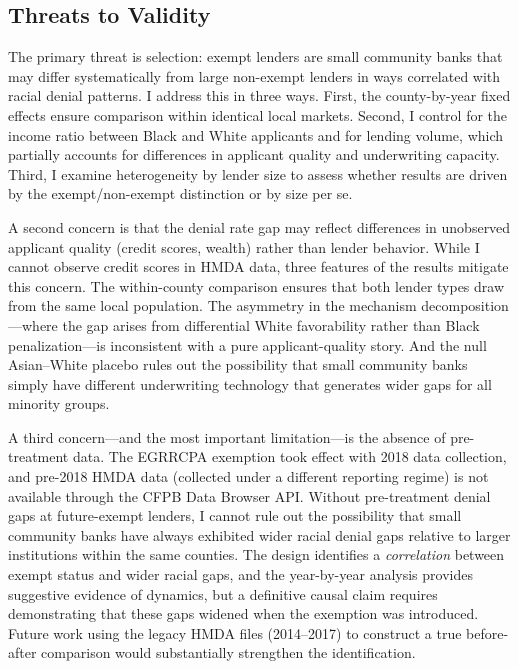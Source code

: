 \documentclass[12pt]{article}
\begin{document}
\subsection{Threats to Validity}

The primary threat is selection: exempt lenders are small community banks that may differ systematically from large non-exempt lenders in ways correlated with racial denial patterns. I address this in three ways. First, the county-by-year fixed effects ensure comparison within identical local markets. Second, I control for the income ratio between Black and White applicants and for lending volume, which partially accounts for differences in applicant quality and underwriting capacity. Third, I examine heterogeneity by lender size to assess whether results are driven by the exempt/non-exempt distinction or by size per se.

A second concern is that the denial rate gap may reflect differences in unobserved applicant quality (credit scores, wealth) rather than lender behavior. While I cannot observe credit scores in HMDA data, three features of the results mitigate this concern. The within-county comparison ensures that both lender types draw from the same local population. The asymmetry in the mechanism decomposition---where the gap arises from differential White favorability rather than Black penalization---is inconsistent with a pure applicant-quality story. And the null Asian--White placebo rules out the possibility that small community banks simply have different underwriting technology that generates wider gaps for all minority groups.

A third concern---and the most important limitation---is the absence of pre-treatment data. The EGRRCPA exemption took effect with 2018 data collection, and pre-2018 HMDA data (collected under a different reporting regime) is not available through the CFPB Data Browser API. Without pre-treatment denial gaps at future-exempt lenders, I cannot rule out the possibility that small community banks have always exhibited wider racial denial gaps relative to larger institutions within the same counties. The design identifies a \textit{correlation} between exempt status and wider racial gaps, and the year-by-year analysis provides suggestive evidence of dynamics, but a definitive causal claim requires demonstrating that these gaps widened when the exemption was introduced. Future work using the legacy HMDA files (2014--2017) to construct a true before-after comparison would substantially strengthen the identification.
\end{document}
